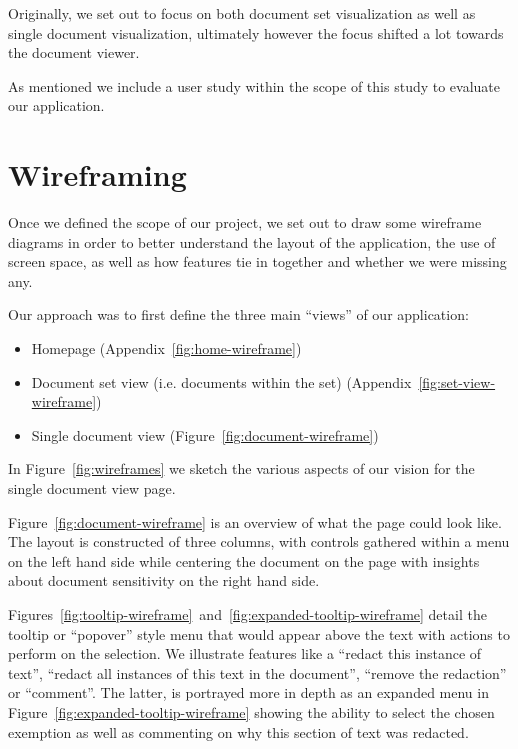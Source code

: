 \documentclass[\version]{l4proj}
\begin{document}
Originally, we set out to focus on both document set visualization as well as single document visualization, ultimately however the focus shifted a lot towards the document viewer.

As mentioned we include a user study within the scope of this study to evaluate our application.

\section{Wireframing}

Once we defined the scope of our project, we set out to draw some wireframe diagrams in order to better understand the layout of the application, the use of screen space, as well as how features tie in together and whether we were missing any.

Our approach was to first define the three main ``views'' of our application:

\begin{itemize}
    \item Homepage (Appendix~\ref{fig:home-wireframe})
    \item Document set view (i.e. documents within the set) (Appendix~\ref{fig:set-view-wireframe})
    \item Single document view (Figure~\ref{fig:document-wireframe})
\end{itemize}

In Figure~\ref{fig:wireframes} we sketch the various aspects of our vision for the single document view page.

Figure~\ref{fig:document-wireframe} is an overview of what the page could look like.
The layout is constructed of three columns, with controls gathered within a menu on the left hand side while centering the document on the page with insights about document sensitivity on the right hand side.

Figures~\ref{fig:tooltip-wireframe}~and~\ref{fig:expanded-tooltip-wireframe} detail the tooltip or ``popover'' style menu that would appear above the text with actions to perform on the selection.
We illustrate features like a ``redact this instance of text'', ``redact all instances of this text in the document'', ``remove the redaction'' or ``comment''.
The latter, is portrayed more in depth as an expanded menu in Figure~\ref{fig:expanded-tooltip-wireframe} showing the ability to select the chosen exemption as well as commenting on why this section of text was redacted.
\end{document}

